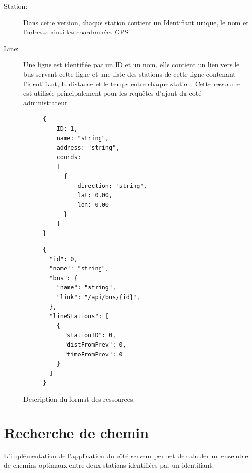 \begin{description}
	\item[Station:] Dans cette version, chaque station contient un Identifiant unique, le nom et l'adresse ainsi les coordonnées GPS.
	\item[Line:] Une ligne est identifiée par un ID et un nom, elle contient un lien vers le bus servant cette ligne et une liste des stations de cette ligne contenant l'identifiant, la distance et le temps entre chaque station. Cette ressource  est utilisée principalement pour les requêtes d'ajout du coté administrateur.
\end{description}
\lstset{style=JSON}

\begin{figure}[h!]
	\begin{subfigure}[b]{0.45\linewidth}
		\begin{lstlisting}[caption=Format JSON de Station]
{
	ID: 1,
	name: "string",
	address: "string",
	coords: 
	[
	  {
	  	  direction: "string",
  		  lat: 0.00,
   		  lon: 0.00
	  }
	]
}
		\end{lstlisting}
	\end{subfigure}\hfill%
	\begin{subfigure}[b]{0.45\linewidth}
		\begin{lstlisting}[caption=Format JSON de Line]
{
  "id": 0,
  "name": "string",
  "bus": {
    "name": "string",
    "link": "/api/bus/{id}",
  },
  "lineStations": [
    {
      "stationID": 0,
      "distFromPrev": 0,
      "timeFromPrev": 0
    }
  ]
}
		\end{lstlisting}
	\end{subfigure}\hfill%
	\caption{Description du format des ressources.}
	\label{fig:formatResources}
\end{figure}


\section{Recherche de chemin}
L'implémentation de l'application du côté serveur permet de calculer un ensemble de chemins optimaux entre deux stations identifiées par un identifiant.
